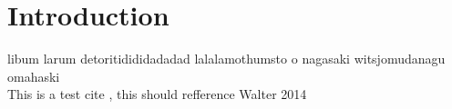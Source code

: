 \section{Introduction}
libum larum detoritidididadadad lalalamothumsto o nagasaki witsjomudanagu omahaski \\
This is a test cite \cite{Walter:2014}, this should refference Walter 2014